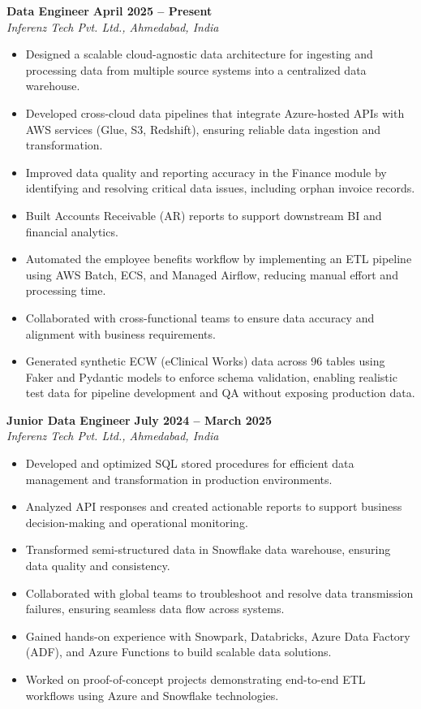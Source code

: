 \documentclass[11pt,a4paper]{article}
\begin{document}
\noindent\textbf{Data Engineer} \hfill \textbf{April 2025 – Present} \\
\textit{Inferenz Tech Pvt. Ltd., Ahmedabad, India}
\begin{itemize}
  \item Designed a scalable cloud-agnostic data architecture for ingesting and processing data from multiple source systems into a centralized data warehouse.
 \item Developed cross-cloud data pipelines that integrate Azure-hosted APIs with AWS services (Glue, S3, Redshift), ensuring reliable data ingestion and transformation.
 \item Improved data quality and reporting accuracy in the Finance module by identifying and resolving critical data issues, including orphan invoice records.
 \item Built Accounts Receivable (AR) reports to support downstream BI and financial analytics.
 \item Automated the employee benefits workflow by implementing an ETL pipeline using AWS Batch, ECS, and Managed Airflow, reducing manual effort and processing time.
 \item Collaborated with cross-functional teams to ensure data accuracy and alignment with business requirements.
 \item Generated synthetic ECW (eClinical Works) data across 96 tables using Faker and Pydantic models to enforce schema validation, enabling realistic test data for pipeline development and QA without exposing production data.
\end{itemize}

\vspace{0.2cm}

\noindent\textbf{Junior Data Engineer} \hfill \textbf{July 2024 – March 2025} \\
\textit{Inferenz Tech Pvt. Ltd., Ahmedabad, India}
\begin{itemize}
  \item Developed and optimized SQL stored procedures for efficient data management and transformation in production environments.
  \item Analyzed API responses and created actionable reports to support business decision-making and operational monitoring.
  \item Transformed semi-structured data in Snowflake data warehouse, ensuring data quality and consistency.
  \item Collaborated with global teams to troubleshoot and resolve data transmission failures, ensuring seamless data flow across systems.
  \item Gained hands-on experience with Snowpark, Databricks, Azure Data Factory (ADF), and Azure Functions to build scalable data solutions.
  \item Worked on proof-of-concept projects demonstrating end-to-end ETL workflows using Azure and Snowflake technologies.
\end{itemize}
\end{document}
